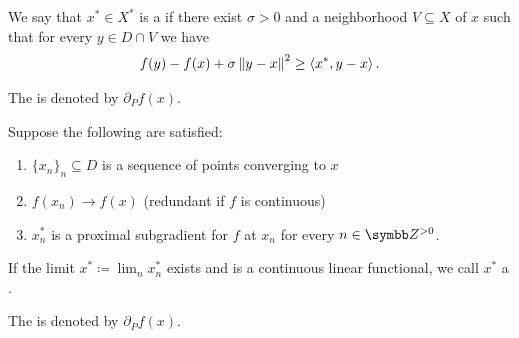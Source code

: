 \begin{definition}
\begin{defenum}
    \item\label{def:subdifferentials/proximal}\cite[227]{Clarke2013} We say that \( x^* \in X^* \) is a  if there exist \( \sigma > 0 \) and a neighborhood \( V \subseteq X \) of \( x \) such that for every \( y \in D \cap V \) we have
    \begin{align*}
      f(y) - f(x) + \sigma \left\Vert y - x \right\Vert^2 \geq \left\langle x^*, y - x \right\rangle.
    \end{align*}

    The  is denoted by \( \partial_P f(x) \).

    \item\label{def:subdifferentials/limiting}\cite[definition 11.10]{Clarke2013} Suppose the following are satisfied:
    \begin{enumerate}
      \item \( \{ x_n \}_n \subseteq D \) is a sequence of points converging to \( x \)
      \item \( f(x_n) \to f(x) \) (redundant if \( f \) is continuous)
      \item \( x_n^* \) is a proximal subgradient for \( f \) at \( x_n \) for every \( n \in \BB{Z}^{>0} \).
    \end{enumerate}

    If the limit \( x^* \coloneqq \lim_n x_n^* \) exists and is a continuous linear functional, we call \( x^* \) a .

    The  is denoted by \( \partial_P f(x) \).
  \end{defenum}
\end{definition}
